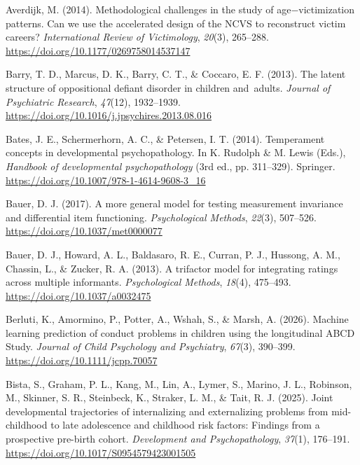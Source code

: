 \documentclass[
  american,
  letterpaper,
  12pt]{article}
\newlength{\cslhangindent}
\newenvironment{CSLReferences}[2] %
 {\begin{list}{}{%
  \setlength{\itemindent}{0pt}
  \setlength{\leftmargin}{0pt}
  \setlength{\parsep}{0pt}
  \ifodd #1
   \setlength{\leftmargin}{\cslhangindent}
   \setlength{\itemindent}{-1\cslhangindent}
  \fi
  \setlength{\itemsep}{#2\baselineskip}}}
 {\end{list}}
\begin{document}
\begin{CSLReferences}{1}{0}
Averdijk, M. (2014). Methodological challenges in the study of
age−victimization patterns. {Can} we use the accelerated design of the
{NCVS} to reconstruct victim careers? \emph{International Review of
Victimology}, \emph{20}(3), 265--288.
\url{https://doi.org/10.1177/0269758014537147}

Barry, T. D., Marcus, D. K., Barry, C. T., \& Coccaro, E. F. (2013). The
latent structure of oppositional defiant disorder in children
and~adults. \emph{Journal of Psychiatric Research}, \emph{47}(12),
1932--1939. \url{https://doi.org/10.1016/j.jpsychires.2013.08.016}

Bates, J. E., Schermerhorn, A. C., \& Petersen, I. T. (2014).
Temperament concepts in developmental psychopathology. In K. Rudolph \&
M. Lewis (Eds.), \emph{Handbook of developmental psychopathology} (3rd
ed., pp. 311--329). Springer.
\url{https://doi.org/10.1007/978-1-4614-9608-3_16}

Bauer, D. J. (2017). A more general model for testing measurement
invariance and differential item functioning. \emph{Psychological
Methods}, \emph{22}(3), 507--526.
\url{https://doi.org/10.1037/met0000077}

Bauer, D. J., Howard, A. L., Baldasaro, R. E., Curran, P. J., Hussong,
A. M., Chassin, L., \& Zucker, R. A. (2013). A trifactor model for
integrating ratings across multiple informants. \emph{Psychological
Methods}, \emph{18}(4), 475--493. \url{https://doi.org/10.1037/a0032475}

Berluti, K., Amormino, P., Potter, A., Wshah, S., \& Marsh, A. (2026).
Machine learning prediction of conduct problems in children using the
longitudinal {ABCD Study}. \emph{Journal of Child Psychology and
Psychiatry}, \emph{67}(3), 390--399.
\url{https://doi.org/10.1111/jcpp.70057}

Bista, S., Graham, P. L., Kang, M., Lin, A., Lymer, S., Marino, J. L.,
Robinson, M., Skinner, S. R., Steinbeck, K., Straker, L. M., \& Tait, R.
J. (2025). Joint developmental trajectories of internalizing and
externalizing problems from mid-childhood to late adolescence and
childhood risk factors: {Findings} from a prospective pre-birth cohort.
\emph{Development and Psychopathology}, \emph{37}(1), 176--191.
\url{https://doi.org/10.1017/S0954579423001505}


\end{CSLReferences}
\end{document}

